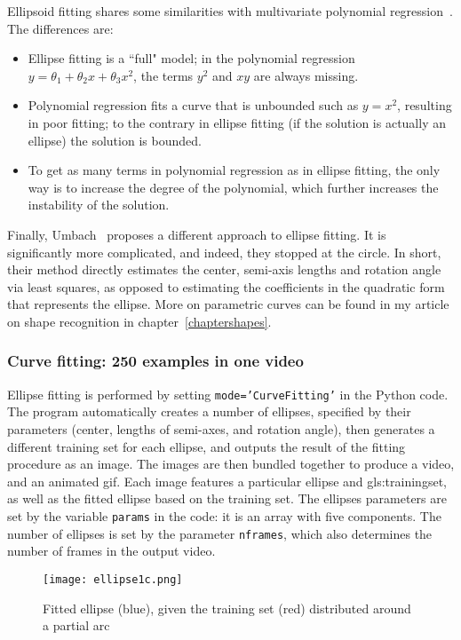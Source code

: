 \documentclass[oneside,10pt]{book}
\begin{document}
\noindent Ellipsoid fitting shares some similarities with multivariate polynomial regression~\cite{vaccari2007}.  The differences are:
\begin{itemize}
\item Ellipse fitting is a ``full" model;  in the polynomial regression $y=\theta_1+\theta_2 x + \theta_3 x^2$, the terms $y^2$ and $xy$ are always missing.
\item Polynomial regression fits a curve that is unbounded such as $y=x^2$, resulting in poor fitting; to the contrary in ellipse fitting (if the solution is actually an ellipse) the solution is bounded.
 \item To get as many terms in polynomial regression as in ellipse fitting, the only way is to increase the degree of the polynomial, which further increases the instability of the solution.
\end{itemize}

\noindent Finally, Umbach~\cite{ieee200y} proposes a different approach to ellipse fitting. It is significantly more complicated, and indeed, they stopped at the circle. In short, their method directly estimates the center, semi-axis lengths and rotation angle via least squares, as opposed to estimating the coefficients in the quadratic form that represents the ellipse. More on parametric curves can be found in my article on shape recognition in chapter~\ref{chaptershapes}.

\subsubsection{Curve fitting: 250 examples in one video}

Ellipse fitting is performed by setting \texttt{mode='CurveFitting'} in the Python code. The program automatically creates a number of ellipses, specified by their parameters (center, lengths of semi-axes, and rotation angle), then generates a different training set for each ellipse, and outputs the result of the fitting procedure as an image. The images are then bundled together to produce a video, and an animated gif. Each image features a particular
 ellipse and \gls{gls:trainingset}, as well as the fitted ellipse based on the training set. The ellipses parameters are set by the variable \texttt{params} in the code: it is an array with five components. The number of ellipses is set by the parameter \texttt{nframes}, which also determines the number of frames in the output video.

\begin{figure}%
\centering
\texttt{[image: ellipse1c.png]}
\caption{Fitted ellipse (blue), given the training set (red) distributed around a partial arc}
\label{fig:ellipse11b}
\end{figure}
\end{document}

